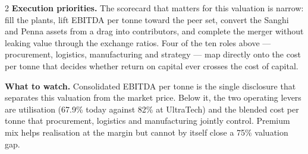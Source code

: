 \vspace{4mm}
\begin{paracol}{2}
\textbf{Execution priorities.} The scorecard that matters for this valuation is
narrow: fill the plants, lift EBITDA per tonne toward the peer set, convert the
Sanghi and Penna assets from a drag into contributors, and complete the merger
without leaking value through the exchange ratios. Four of the ten roles above —
procurement, logistics, manufacturing and strategy — map directly onto the cost per
tonne that decides whether return on capital ever crosses the cost of capital.

\switchcolumn
\textbf{What to watch.} Consolidated EBITDA per tonne is the single disclosure that
separates this valuation from the market price. Below it, the two operating levers
are utilisation (67.9\% today against 82\% at UltraTech) and the blended cost per
tonne that procurement, logistics and manufacturing jointly control. Premium mix
helps realisation at the margin but cannot by itself close a 75\% valuation gap.
\end{paracol}
\clearpage

